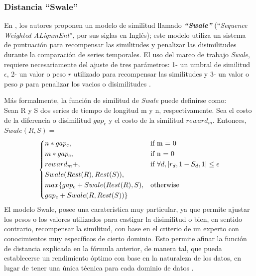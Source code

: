 \subsubsection{\textbf{Distancia \enquote{Swale}}}
En \cite{swale}, los autores proponen un modelo de similitud llamado \textbf{\textit{\enquote{Swale}}} (\enquote{\textit{Sequence Weighted ALignmEnt}}, por sus siglas en Ingl\'es); este modelo utiliza un sistema de puntuaci\'on para recompensar las similitudes y penalizar las disimilitudes durante la comparaci\'on de series temporales. El uso del marco de trabajo \textit{Swale}, requiere necesariamente del ajuste de tres par\'ametros: 1- un umbral de similitud \textbf{$\epsilon$}, 2- un valor o peso $r$ utilizado para recompensar las similitudes y 3- un valor o peso $p$ para penalizar los vacios o disimilitudes \cite{swale}.\par
M\'as formalmente, la funci\'on de similitud de \textit{Swale} puede definirse como:\\
Sean R y S dos series de tiempo de longitud m y n, respectivamente. Sea el costo de la diferencia o disimilitud $gap_c$ y el costo de la similitud $reward_m$. Entonces,	$Swale(R, S) =$
\[
\begin{dcases}
    {n * gap_c},&   \text{if m = 0}\\
    {m * gap_c},&   \text{if n = 0}\\
    {reward_m + },& \text{if }{\forall d, |r_d,1 - S_d,1| \leq \epsilon}\\   
    {Swale(Rest(R), Rest(S)),}\\
    {max\{gap_c + Swale(Rest(R),S)}, & \text{otherwise}\\
    {gap_c + Swale(R, Rest(S))}\} 
\end{dcases}
\]
El modelo Swale, posee una carater\'istica muy particular, ya que permite ajustar los pesos o los valores utilizados para castigar la disimilitud o bien, en sentido contrario, recompensar la similitud, con base en el criterio de un experto con conocimientos muy espec\'ificos de cierto dominio. Esto permite afinar la funci\'on de distancia explicada en la f\'ormula anterior, de manera tal, que pueda establecerse un rendimiento \'optimo con base en la naturaleza de los datos, en lugar de tener una \'unica t\'ecnica para cada dominio de datos \cite{swale}.
